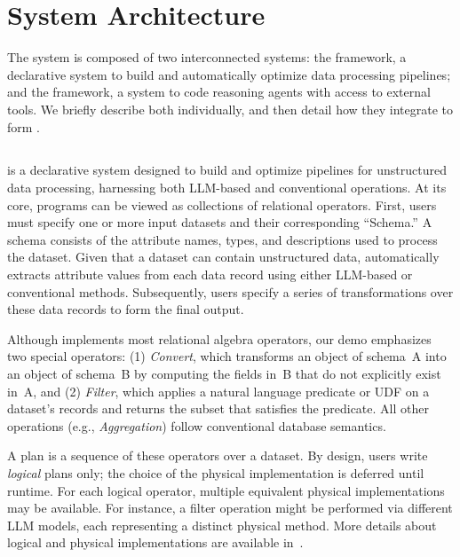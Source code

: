 \section{System Architecture}
\label{sec:architecture}

The \chat{} system is composed of two interconnected systems: the \sys{} framework, a declarative system to build and automatically optimize data processing pipelines; and the \archytas{} framework, a system to code reasoning agents with access to external tools.
We briefly describe both individually, and then detail how they integrate to form \chat{}.

\subsection{\sys{}}
\sys{} is a declarative system designed to build and optimize pipelines for unstructured data processing, harnessing both LLM-based and conventional operations. At its core, \sys{} programs can be viewed as collections of relational operators. First, users must specify one or more input datasets and their corresponding “Schema.” A schema consists of the attribute names, types, and descriptions used to process the dataset. Given that a dataset can contain unstructured data, \sys{} automatically extracts attribute values from each data record using either LLM-based or conventional methods. Subsequently, users specify a series of transformations over these data records to form the final output. 

Although \sys{} implements most relational algebra operators, our demo emphasizes two special operators: (1) \emph{Convert}, which transforms an object of schema~A into an object of schema~B by computing the fields in~B that do not explicitly exist in~A, and (2) \emph{Filter}, which applies a natural language predicate or UDF on a dataset’s records and returns the subset that satisfies the predicate. All other operations (e.g., \emph{Aggregation}) follow conventional database semantics.

A \sys{} plan is a sequence of these operators over a dataset. By design, users write \emph{logical} plans only; the choice of the physical implementation is deferred until runtime. For each logical operator, multiple equivalent physical implementations may be available. For instance, a filter operation might be performed via different LLM models, each representing a distinct physical method. More details about logical and physical implementations are available in~\cite{palimpzestCIDR}.

